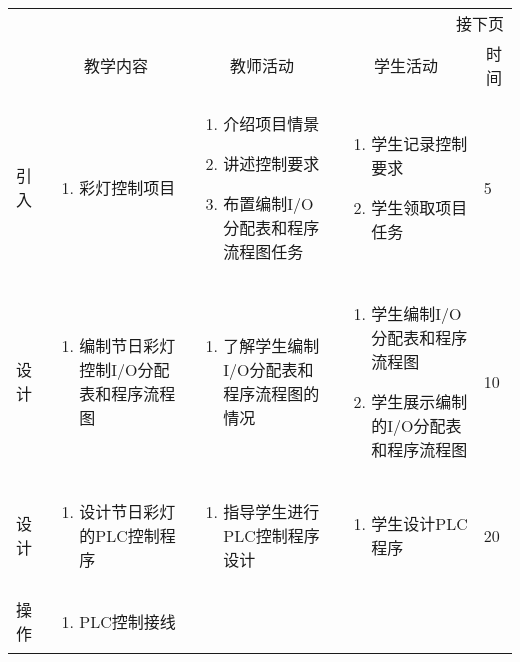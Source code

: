 {\begin{landscape}
\begin{longtable}{|m{10mm}|m{50mm}|m{50mm}|m{50mm}|m{15mm}|}
\multicolumn{5}{r}{\small 接下页}\\
\endfoot
\hline
\endlastfoot
\multicolumn{1}{|c|}{步骤}&\multicolumn{1}{c|}{教学内容}&\multicolumn{1}{c|}{教师活动}&\multicolumn{1}{c|}{学生活动}&\multicolumn{1}{c|}{时间}\\\hline
引入&\begin{enumerate}
\item 彩灯控制项目
\end{enumerate} &\begin{enumerate}
\item 介绍项目情景
\item 讲述控制要求
\item 布置编制I/O分配表和程序流程图任务
\end{enumerate} &\begin{enumerate}
\item 学生记录控制要求
\item 学生领取项目任务
\end{enumerate} &5 \\\hline
设计&
\begin{enumerate}
\item 编制节日彩灯控制I/O分配表和程序流程图
\end{enumerate} &\begin{enumerate}
\item 了解学生编制I/O分配表和程序流程图的情况
\end{enumerate} &\begin{enumerate}
\item 学生编制I/O分配表和程序流程图
\item 学生展示编制的I/O分配表和程序流程图
\end{enumerate} &10 \\\hline
设计&\begin{enumerate}
\item 设计节日彩灯的PLC控制程序
\end{enumerate}
&\begin{enumerate}
\item 指导学生进行PLC控制程序设计
\end{enumerate} &\begin{enumerate}
\item 学生设计PLC程序
\end{enumerate} &20 \\\hline
操作&
\begin{enumerate}
\item PLC控制接线
\end{enumerate} &\begin{enumerate}

\end{enumerate}
\end{longtable}
\end{landscape}}
